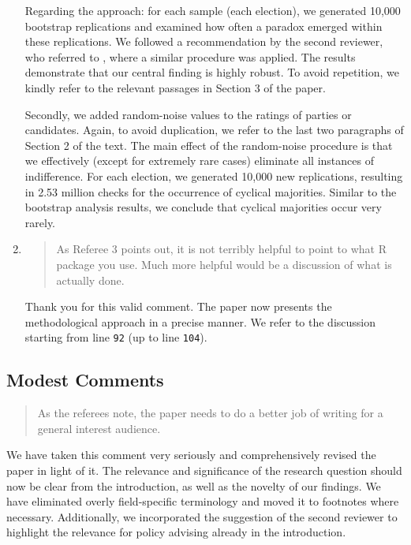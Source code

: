 \documentclass[a4paper, 12pt]{scrartcl}
\begin{document}
\begin{enumerate}[label=(\alph*)]
Regarding the approach: for each sample (each election), we generated 10,000 bootstrap replications and examined how often a paradox emerged within these replications. We followed a recommendation by the second reviewer, who referred to \cite{Darmann2019}, where a similar procedure was applied. The results demonstrate that our central finding is highly robust. To avoid repetition, we kindly refer to the relevant passages in Section 3 of the paper.

Secondly, we added random-noise values to the ratings of parties or candidates. Again, to avoid duplication, we refer to the last two paragraphs of Section 2 of the text. The main effect of the random-noise procedure is that we effectively (except for extremely rare cases) eliminate all instances of indifference. For each election, we generated 10,000 new replications, resulting in 2.53 million checks for the occurrence of cyclical majorities. Similar to the bootstrap analysis results, we conclude that cyclical majorities occur very rarely.

\item \begin{quote}
As Referee 3 points out, it is not terribly helpful to point to what R package you use. Much more helpful would be a discussion of what is actually done.
\end{quote}
Thank you for this valid comment. The paper now presents the methodological approach in a precise manner. We refer to the discussion starting from line \texttt{92} (up to line \texttt{104}).
\end{enumerate}

\subsection*{Modest Comments}
\begin{quotation}
 As the referees note, the paper needs to do a better job of writing for a general interest audience.
\end{quotation}

We have taken this comment very seriously and comprehensively revised the paper in light of it. The relevance and significance of the research question should now be clear from the introduction, as well as the novelty of our findings. We have eliminated overly field-specific terminology and moved it to footnotes where necessary. Additionally, we incorporated the suggestion of the second reviewer to highlight the relevance for policy advising already in the introduction.
\end{document}
